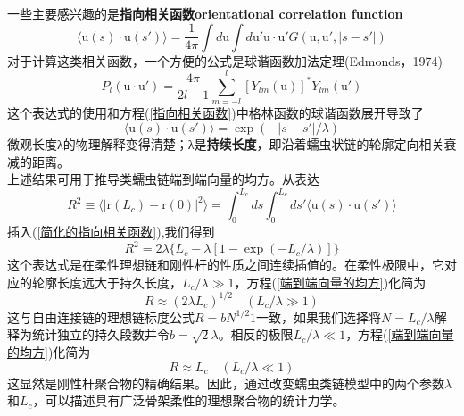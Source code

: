 一些主要感兴趣的是\textbf{指向相关函数orientational correlation function}\\
\begin{equation}
	\langle \mathrm{u}(s)\cdot \mathrm{u}(s')\rangle =\frac{1}{4\pi}\int d\mathrm{u}\int d\mathrm{u}'\mathrm{u}\cdot \mathrm{u}'G(\mathrm{u},\mathrm{u}',|s-s'|)\label{指向相关函数}
\end{equation}
对于计算这类相关函数，一个方便的公式是球谐函数加法定理(Edmonds，1974)\\
\begin{equation}
P_l(\mathrm{u}\cdot \mathrm{u}')=\frac{4\pi}{2l+1}\sum_{m=-l}^{l}[Y_{lm}(\mathrm{u})]^*Y_{lm}(\mathrm{u}')
\end{equation}
这个表达式的使用和方程(\ref{指向相关函数})中格林函数的球谐函数展开导致了\\
\begin{equation}
	\langle \mathrm{u}(s) \cdot \mathrm{u}(s')\rangle=\exp(-|s-s'|/\lambda)\label{简化的指向相关函数}
\end{equation}
微观长度λ的物理解释变得清楚；λ是\textbf{持续长度}，即沿着蠕虫状链的轮廓定向相关衰减的距离。\\

上述结果可用于推导类蠕虫链端到端向量的均方。从表达\\
\begin{equation}
R^2 \equiv\langle|\mathrm{r}(L_c)-\mathrm{r}(0)|^2\rangle =\int_{0}^{L_c}ds \int_{0}^{L_c}ds'\langle \mathrm{u}(s)\cdot \mathrm{u}(s')\rangle
\end{equation}
插入(\ref{简化的指向相关函数}),我们得到\\
\begin{equation}
	R^2 =2\lambda\{L_c-\lambda[1-\exp(-L_c/\lambda)]\}\label{端到端向量的均方}
\end{equation}
这个表达式是在柔性理想链和刚性杆的性质之间连续插值的。在柔性极限中，它对应的轮廓长度远大于持久长度，$L_c/\lambda \gg 1$，方程(\ref{端到端向量的均方})化简为\\
\begin{equation}
R\approx(2\lambda L_c)^{1/2} \quad (L_c/\lambda \gg 1)
\end{equation}
这与自由连接链的理想链标度公式$R=bN^{1/2} 1$一致，如果我们选择将$N=L_c/\lambda$解释为统计独立的持久段数并令$b=\sqrt{2}\lambda$。相反的极限$L_c/\lambda \ll 1$，方程(\ref{端到端向量的均方})化简为\\
\begin{equation}
R \approx L_c \quad (L_c/\lambda \ll 1)
\end{equation}
这显然是刚性杆聚合物的精确结果。因此，通过改变蠕虫类链模型中的两个参数$\lambda$和$L_c$，可以描述具有广泛骨架柔性的理想聚合物的统计力学。\\

